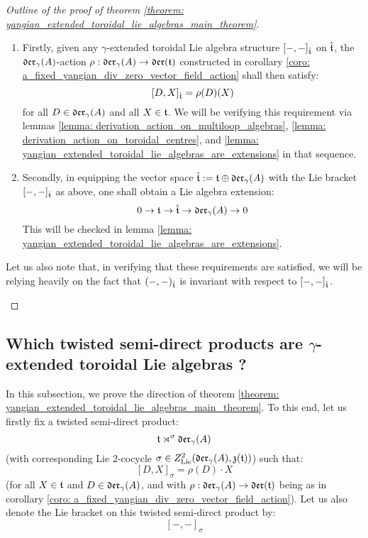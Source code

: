\begin{proof}[Outline of the proof of theorem \ref{theorem: yangian_extended_toroidal_lie_algebras_main_theorem}]
\begin{itemize}
                \begin{enumerate}
                    \item Firstly, given any $\gamma$-extended toroidal Lie algebra structure $[-, -]_{\hat{\mathfrak{t}}}$ on $\hat{\mathfrak{t}}$, the $\mathfrak{der}_{\gamma}(A)$-action $\rho: \mathfrak{der}_{\gamma}(A) \to \mathfrak{der}(\mathfrak{t})$ constructed in corollary \ref{coro: a_fixed_yangian_div_zero_vector_field_action} shall then satisfy:
                        $$[D, X]_{\hat{\mathfrak{t}}} = \rho(D)(X)$$
                    for all $D \in \mathfrak{der}_{\gamma}(A)$ and all $X \in \mathfrak{t}$. We will be verifying this requirement via lemmas \ref{lemma: derivation_action_on_multiloop_algebras}, \ref{lemma: derivation_action_on_toroidal_centres}, and \ref{lemma: yangian_extended_toroidal_lie_algebras_are_extensions} in that sequence.
                    \item Secondly, in equipping the vector space $\hat{\mathfrak{t}} := \mathfrak{t} \oplus \mathfrak{der}_{\gamma}(A)$ with the Lie bracket $[-, -]_{\hat{\mathfrak{t}}}$ as above, one shall obtain a Lie algebra extension:
                        $$0 \to \mathfrak{t} \to \hat{\mathfrak{t}} \to \mathfrak{der}_{\gamma}(A) \to 0$$
                    This will be checked in lemma \ref{lemma: yangian_extended_toroidal_lie_algebras_are_extensions}.
                \end{enumerate}
                Let us also note that, in verifying that these requirements are satisfied, we will be relying heavily on the fact that $(-, -)_{\hat{\mathfrak{t}}}$ is invariant with respect to $[-, -]_{\hat{\mathfrak{t}}}$.
            \end{itemize}
        \end{proof}

    \subsection{Which twisted semi-direct products are \texorpdfstring{$\gamma$}{}-extended toroidal Lie algebras ?} \label{subsection: which_twisted_semi_direct_products_are_yangian_extended_toroidal_lie_algebras}
        In this subsection, we prove the  direction of theorem \ref{theorem: yangian_extended_toroidal_lie_algebras_main_theorem}. To this end, let us firstly fix a twisted semi-direct product:
            $$\mathfrak{t} \rtimes^{\sigma} \mathfrak{der}_{\gamma}(A)$$
        (with corresponding Lie $2$-cocycle $\sigma \in Z^2_{\mathrm{Lie}}(\mathfrak{der}_{\gamma}(A), \mathfrak{z}(\mathfrak{t}))$) such that:
            $$[D, X]_{\sigma} = \rho(D) \cdot X$$
        (for all $X \in \mathfrak{t}$ and $D \in \mathfrak{der}_{\gamma}(A)$, and with $\rho: \mathfrak{der}_{\gamma}(A) \to \mathfrak{der}(\mathfrak{t})$ being as in corollary \ref{coro: a_fixed_yangian_div_zero_vector_field_action}). Let us also denote the Lie bracket on this twisted semi-direct product by:
            $$[-, -]_{\sigma}$$

